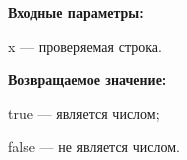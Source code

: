\textbf{Входные параметры:}

x --- проверяемая строка.

\textbf{Возвращаемое значение:}
 
true --- является числом;

false --- не является числом.